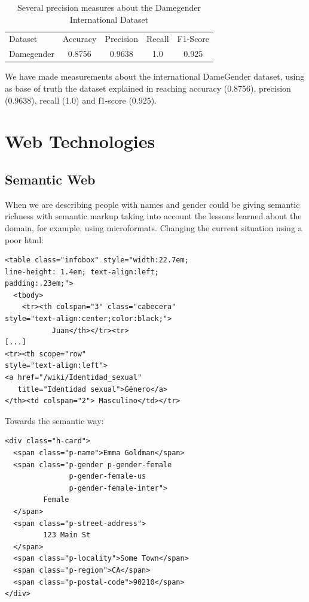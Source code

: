\documentclass[a4paper]{article}
\begin{document}
\begin{table}[t]
\footnotesize
\begin{tabular}[]{lcccc}
  \hline
  Dataset  & Accuracy & Precision & Recall & F1-Score  \tabularnewline
  Damegender &  0.8756  & 0.9638    & 1.0    & 0.925  \tabularnewline
  \hline
\end{tabular}
\caption{Several precision measures about the Damegender International Dataset}
\label{table:DifferentAccuracyMeasures}
\end{table}

We have made measurements about the international DameGender dataset,
using as base of truth the dataset explained in
\cite{10.7717/peerj-cs.156} reaching accuracy (0.8756), precision
(0.9638), recall (1.0) and f1-score (0.925).

\section{Web Technologies}
\label{sec:webtech}

\subsection{Semantic Web}
\label{sec:semantic}

When we are describing people with names and gender could be giving
semantic richness with semantic markup taking into account the lessons
learned about the domain, for example, using microformats. Changing the
current situation using a poor html:

\begin{verbatim}
<table class="infobox" style="width:22.7em; 
line-height: 1.4em; text-align:left; 
padding:.23em;">
  <tbody>
    <tr><th colspan="3" class="cabecera"
style="text-align:center;color:black;">
           Juan</th></tr><tr>
[...]
<tr><th scope="row"
style="text-align:left">
<a href="/wiki/Identidad_sexual" 
   title="Identidad sexual">Género</a>
</th><td colspan="2"> Masculino</td></tr>
\end{verbatim}

Towards the semantic way:

\begin{verbatim}
<div class="h-card">
  <span class="p-name">Emma Goldman</span>
  <span class="p-gender p-gender-female 
               p-gender-female-us 
               p-gender-female-inter">
         Female
  </span>      
  <span class="p-street-address">
         123 Main St
  </span>
  <span class="p-locality">Some Town</span>
  <span class="p-region">CA</span>
  <span class="p-postal-code">90210</span>
</div>
\end{verbatim}
\end{document}
